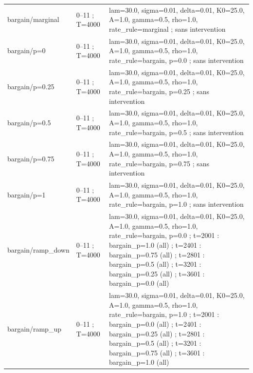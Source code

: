 {\begin{longtable}{@{}p{.27\linewidth}p{.14\linewidth}p{.53\linewidth}@{}}
bargain/\allowbreak{}marginal & 0--11 ; T=4000 & lam=30.0,\allowbreak{}  sigma=0.01,\allowbreak{}  delta=0.01,\allowbreak{}  K0=25.0,\allowbreak{}  A=1.0,\allowbreak{}  gamma=0.5,\allowbreak{}  rho=1.0,\allowbreak{}  rate\_\allowbreak{}rule=marginal ; sans intervention \\
bargain/\allowbreak{}p=0 & 0--11 ; T=4000 & lam=30.0,\allowbreak{}  sigma=0.01,\allowbreak{}  delta=0.01,\allowbreak{}  K0=25.0,\allowbreak{}  A=1.0,\allowbreak{}  gamma=0.5,\allowbreak{}  rho=1.0,\allowbreak{}  rate\_\allowbreak{}rule=bargain,\allowbreak{}  p=0.0 ; sans intervention \\
bargain/\allowbreak{}p=0.25 & 0--11 ; T=4000 & lam=30.0,\allowbreak{}  sigma=0.01,\allowbreak{}  delta=0.01,\allowbreak{}  K0=25.0,\allowbreak{}  A=1.0,\allowbreak{}  gamma=0.5,\allowbreak{}  rho=1.0,\allowbreak{}  rate\_\allowbreak{}rule=bargain,\allowbreak{}  p=0.25 ; sans intervention \\
bargain/\allowbreak{}p=0.5 & 0--11 ; T=4000 & lam=30.0,\allowbreak{}  sigma=0.01,\allowbreak{}  delta=0.01,\allowbreak{}  K0=25.0,\allowbreak{}  A=1.0,\allowbreak{}  gamma=0.5,\allowbreak{}  rho=1.0,\allowbreak{}  rate\_\allowbreak{}rule=bargain,\allowbreak{}  p=0.5 ; sans intervention \\
bargain/\allowbreak{}p=0.75 & 0--11 ; T=4000 & lam=30.0,\allowbreak{}  sigma=0.01,\allowbreak{}  delta=0.01,\allowbreak{}  K0=25.0,\allowbreak{}  A=1.0,\allowbreak{}  gamma=0.5,\allowbreak{}  rho=1.0,\allowbreak{}  rate\_\allowbreak{}rule=bargain,\allowbreak{}  p=0.75 ; sans intervention \\
bargain/\allowbreak{}p=1 & 0--11 ; T=4000 & lam=30.0,\allowbreak{}  sigma=0.01,\allowbreak{}  delta=0.01,\allowbreak{}  K0=25.0,\allowbreak{}  A=1.0,\allowbreak{}  gamma=0.5,\allowbreak{}  rho=1.0,\allowbreak{}  rate\_\allowbreak{}rule=bargain,\allowbreak{}  p=1.0 ; sans intervention \\
bargain/\allowbreak{}ramp\_\allowbreak{}down & 0--11 ; T=4000 & lam=30.0,\allowbreak{}  sigma=0.01,\allowbreak{}  delta=0.01,\allowbreak{}  K0=25.0,\allowbreak{}  A=1.0,\allowbreak{}  gamma=0.5,\allowbreak{}  rho=1.0,\allowbreak{}  rate\_\allowbreak{}rule=bargain,\allowbreak{}  p=0.0 ; t=2001 : bargain\_\allowbreak{}p=1.0 (all) ; t=2401 : bargain\_\allowbreak{}p=0.75 (all) ; t=2801 : bargain\_\allowbreak{}p=0.5 (all) ; t=3201 : bargain\_\allowbreak{}p=0.25 (all) ; t=3601 : bargain\_\allowbreak{}p=0.0 (all) \\
bargain/\allowbreak{}ramp\_\allowbreak{}up & 0--11 ; T=4000 & lam=30.0,\allowbreak{}  sigma=0.01,\allowbreak{}  delta=0.01,\allowbreak{}  K0=25.0,\allowbreak{}  A=1.0,\allowbreak{}  gamma=0.5,\allowbreak{}  rho=1.0,\allowbreak{}  rate\_\allowbreak{}rule=bargain,\allowbreak{}  p=1.0 ; t=2001 : bargain\_\allowbreak{}p=0.0 (all) ; t=2401 : bargain\_\allowbreak{}p=0.25 (all) ; t=2801 : bargain\_\allowbreak{}p=0.5 (all) ; t=3201 : bargain\_\allowbreak{}p=0.75 (all) ; t=3601 : bargain\_\allowbreak{}p=1.0 (all) \\

\end{longtable}}
